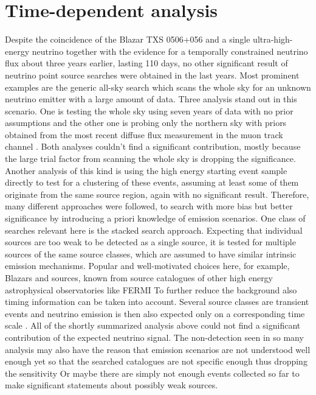 \chapter{Time-dependent analysis}
  \label{chp:time_dep}
Despite the coincidence of the Blazar TXS 0506+056 and a single ultra-high-energy neutrino together with the evidence for a temporally constrained neutrino flux about three years earlier, lasting 110 days, no other significant result of neutrino point source searches were obtained in the last years.
Most prominent examples are the generic all-sky search which scans the whole sky for an unknown neutrino emitter with a large amount of data.
Three analysis stand out in this scenario.
One is testing the whole sky using seven years of data with no prior assumptions  and the other one is probing only the northern sky with priors obtained from the most recent diffuse flux measurement in the muon track channel .
Both analyses couldn't find a significant contribution, mostly because the large trial factor from scanning the whole sky is dropping the significance.
Another analysis of this kind is using the high energy starting event sample directly to test for a clustering of these events, assuming at least some of them originate from the same source region, again with no significant result.
Therefore, many different approaches were followed, to search with more bias but better significance by introducing a priori knowledge of emission scenarios.
One class of searches relevant here is the stacked search approach.
Expecting that individual sources are too weak to be detected as a single source, it is tested for multiple sources of the same source classes, which are assumed to have similar intrinsic emission mechanisms.
Popular and well-motivated choices here, for example, Blazars and sources, known from source catalogues of other high energy astrophysical observatories like FERMI 
To further reduce the background also timing information can be taken into account.
Several source classes are transient events and neutrino emission is then also expected only on a corresponding time scale .
All of the shortly summarized analysis above could not find a significant contribution of the expected neutrino signal.
The non-detection seen in so many analysis may also have the reason that emission scenarios are not understood well enough yet so that the searched catalogues are not specific enough thus dropping the sensitivity Or maybe there are simply not enough events collected so far to make significant statements about possibly weak sources.

